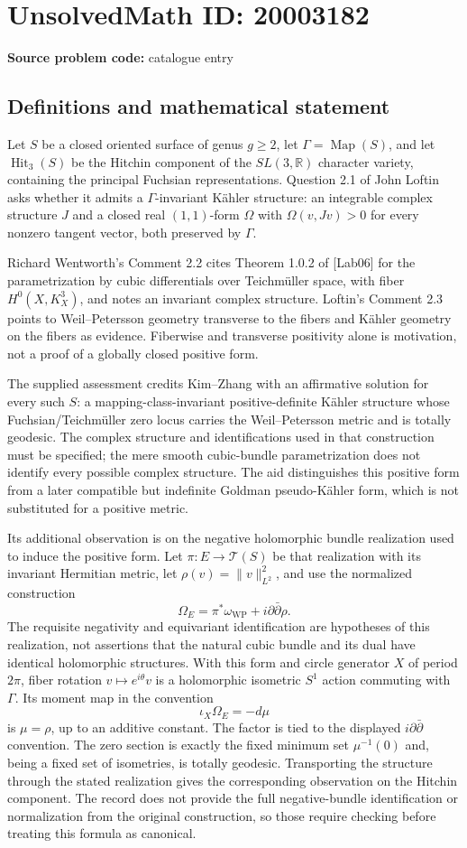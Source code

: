 \documentclass[11pt]{article}
\newcommand{\R}{\mathbb{R}}
\begin{document}
\section*{UnsolvedMath ID: 20003182}
\textbf{Source problem code:} catalogue entry
\subsection{Definitions and mathematical statement}
Let $S$ be a closed oriented surface of genus $g\geq2$, let $\Gamma=\operatorname{Map}(S)$, and let $\operatorname{Hit}_3(S)$ be the Hitchin component of the $SL(3,\R)$ character variety, containing the principal Fuchsian representations. Question 2.1 of John Loftin asks whether it admits a $\Gamma$-invariant K\"ahler structure: an integrable complex structure $J$ and a closed real $(1,1)$-form $\Omega$ with $\Omega(v,Jv)>0$ for every nonzero tangent vector, both preserved by $\Gamma$.

Richard Wentworth's Comment 2.2 cites Theorem 1.0.2 of [Lab06] for the parametrization by cubic differentials over Teichm\"uller space, with fiber $H^0(X,K_X^3)$, and notes an invariant complex structure. Loftin's Comment 2.3 points to Weil--Petersson geometry transverse to the fibers and K\"ahler geometry on the fibers as evidence. Fiberwise and transverse positivity alone is motivation, not a proof of a globally closed positive form.

The supplied assessment credits Kim--Zhang with an affirmative solution for every such $S$: a mapping-class-invariant positive-definite K\"ahler structure whose Fuchsian/Teichm\"uller zero locus carries the Weil--Petersson metric and is totally geodesic. The complex structure and identifications used in that construction must be specified; the mere smooth cubic-bundle parametrization does not identify every possible complex structure. The aid distinguishes this positive form from a later compatible but indefinite Goldman pseudo-K\"ahler form, which is not substituted for a positive metric.

Its additional observation is on the negative holomorphic bundle realization used to induce the positive form. Let $\pi:E\to\mathcal T(S)$ be that realization with its invariant Hermitian metric, let $\rho(v)=\|v\|_{L^2}^2$, and use the normalized construction
\[
 \Omega_E=\pi^*\omega_{\mathrm{WP}}+i\partial\bar\partial\rho.
\]
The requisite negativity and equivariant identification are hypotheses of this realization, not assertions that the natural cubic bundle and its dual have identical holomorphic structures. With this form and circle generator $X$ of period $2\pi$, fiber rotation $v\mapsto e^{i\theta}v$ is a holomorphic isometric $S^1$ action commuting with $\Gamma$. Its moment map in the convention
\[
 \iota_X\Omega_E=-d\mu
\]
is $\mu=\rho$, up to an additive constant. The factor is tied to the displayed $i\partial\bar\partial$ convention. The zero section is exactly the fixed minimum set $\mu^{-1}(0)$ and, being a fixed set of isometries, is totally geodesic. Transporting the structure through the stated realization gives the corresponding observation on the Hitchin component. The record does not provide the full negative-bundle identification or normalization from the original construction, so those require checking before treating this formula as canonical.
\end{document}
